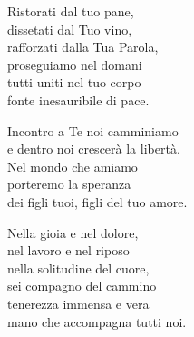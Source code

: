 \settowidth{\versewidth}{Ristorati dal tuo pane,}
\begin{canzone}%
Ristorati dal tuo pane,\\
dissetati dal Tuo vino,\\
rafforzati dalla Tua Parola,\\
proseguiamo nel domani\\
tutti uniti nel tuo corpo\\
fonte inesauribile di pace.

\begin{ritornello}
Incontro a Te noi camminiamo\\
e dentro noi crescerà la libertà.\\
Nel mondo che amiamo\\
porteremo la speranza\\
dei figli tuoi, figli del tuo amore.%
\end{ritornello}

Nella gioia e nel dolore,\\
nel lavoro e nel riposo\\
nella solitudine del cuore,\\
sei compagno del cammino\\
tenerezza immensa e vera\\
mano che accompagna tutti noi.
\end{canzone}